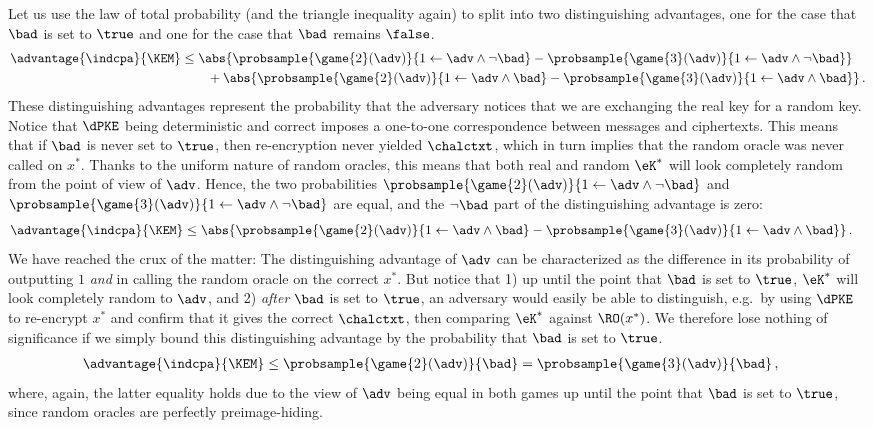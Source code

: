       Let us use the law of total probability (and the triangle inequality
        again) to split into two distinguishing advantages, one for
        the case that $\bad$ is set to $\true$ and one for the case that $\bad$
        remains $\false$.
        \begin{align*}
          \advantage{\indcpa}{\KEM} &\leq 
            \abs{ \probsample{ \game{2}(\adv) }{1 \gets \adv \land \neg \bad} 
              - \probsample{ \game{3}(\adv) }{1 \gets \adv \land \neg \bad}} \\
            &\qquad + \abs{ \probsample{ \game{2}(\adv) }{1 \gets \adv \land \bad} 
              - \probsample{ \game{3}(\adv) }{1 \gets \adv \land \bad}}\, .
        \end{align*}
        These distinguishing advantages represent the probability that the adversary notices
        that we are exchanging the real key for a random key. Notice that
        $\dPKE$ being deterministic and correct imposes a one-to-one
        correspondence between messages and ciphertexts. This means that if $\bad$ 
        is never set to $\true$, then re-encryption never yielded $\chalctxt$,
        which in turn implies that the random oracle was never called on $x^*$. 
        Thanks to the uniform nature of random oracles, this means that 
        both real and random $\eK^*$ will look completely random from the
        point of view of $\adv$. Hence, the two probabilities 
        $\probsample{ \game{2}(\adv) }{1 \gets \adv \land \neg \bad}$
        and
        $\probsample{ \game{3}(\adv) }{1 \gets \adv \land \neg \bad}$
        are equal, and the $\neg \bad$ part of the distinguishing advantage is
        zero:
        \begin{align*}
          \advantage{\indcpa}{\KEM} &\leq 
            \abs{ \probsample{ \game{2}(\adv) }{1 \gets \adv \land \bad} 
              - \probsample{ \game{3}(\adv) }{1 \gets \adv \land \bad}}\, . 
        \end{align*}
        We have reached the crux of the matter: The distinguishing
        advantage of $\adv$ can be characterized as the difference in its
        probability of outputting $1$ \emph{and} in calling the random oracle on
        the correct $x^*$. But notice that 1) up until the point that $\bad$ is set to
        $\true$, $\eK^*$ will look completely random to $\adv$, and 2) \emph{after}
        $\bad$ is set to $\true$, an adversary would easily be able to
        distinguish, e.g.\ by using $\dPKE$ to
        re-encrypt $x^*$ and confirm that it gives the correct
        $\chalctxt$, then comparing $\eK^*$ against $\RO(x^*)$.
        We therefore lose nothing of significance if we simply bound this
        distinguishing advantage by the probability that $\bad$ is set to $\true$.
        \begin{align*}
          \advantage{\indcpa}{\KEM} &\leq 
            \probsample{ \game{2}(\adv) }{\bad} 
              = \probsample{ \game{3}(\adv) }{\bad}\, ,
        \end{align*}
        where, again, the latter equality holds due to the view of $\adv$ being equal
        in both games up until the point that $\bad$ is set to $\true$, since
        random oracles are perfectly preimage-hiding.

  

